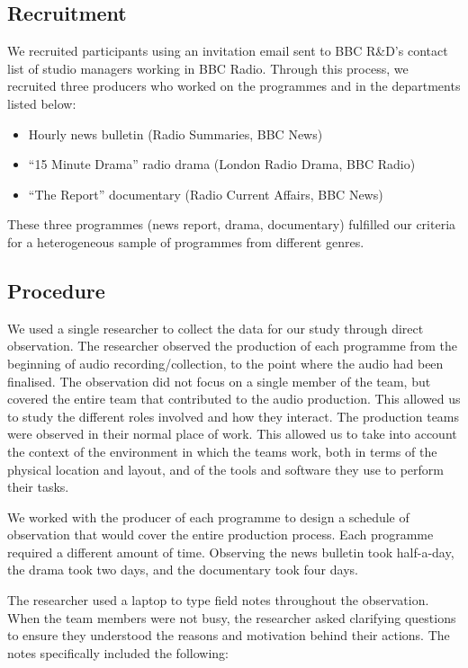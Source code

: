 \subsection{Recruitment}
We recruited participants using an invitation email sent to BBC R\&D's contact list of studio managers working in BBC
Radio. Through this process, we recruited three producers who worked on the programmes and in the departments listed
below:
\begin{itemize}
	\item Hourly news bulletin (Radio Summaries, BBC News)
	\item ``15 Minute Drama'' radio drama (London Radio Drama, BBC Radio)
	\item ``The Report'' documentary (Radio Current Affairs, BBC News)
\end{itemize}

These three programmes (news report, drama, documentary) fulfilled our criteria for a heterogeneous sample of
programmes from different genres.

\subsection{Procedure}
We used a single researcher to collect the data for our study through direct observation. The researcher observed the
production of each programme from the beginning of audio recording/collection, to the point where the audio had been
finalised. The observation did not focus on a single member of the team, but covered the entire team that
contributed to the audio production. This allowed us to study the different roles involved  and how they interact.  The
production teams were observed in their normal place of work. This allowed us to take into account the context of the
environment in which the teams work, both in terms of the physical location and layout, and of the tools and software
they use to perform their tasks.

We worked with the producer of each programme to design a schedule of observation that would cover the entire
production process. Each programme required a different amount of time. Observing the news bulletin took half-a-day,
the drama took two days, and the documentary took four days. 

The researcher used a laptop to type field notes throughout the observation. When the team members were
not busy, the researcher asked clarifying questions to ensure they understood the reasons and motivation behind their
actions. The notes specifically included the following:

